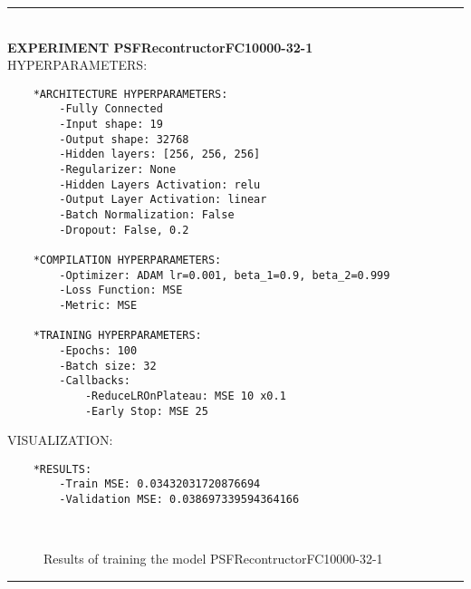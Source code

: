 \rule{0.5\textwidth}{0.5pt}\\

	{\large \textbf{EXPERIMENT PSFRecontructorFC10000-32-1}}\\
	
	{\normalsize HYPERPARAMETERS:}
	\begin{lstlisting}
	*ARCHITECTURE HYPERPARAMETERS:
		-Fully Connected
		-Input shape: 19
		-Output shape: 32768
		-Hidden layers: [256, 256, 256]
		-Regularizer: None
		-Hidden Layers Activation: relu
		-Output Layer Activation: linear
		-Batch Normalization: False
		-Dropout: False, 0.2
	
	*COMPILATION HYPERPARAMETERS:
		-Optimizer: ADAM lr=0.001, beta_1=0.9, beta_2=0.999
		-Loss Function: MSE
		-Metric: MSE
	
	*TRAINING HYPERPARAMETERS:
		-Epochs: 100
		-Batch size: 32
		-Callbacks: 
			-ReduceLROnPlateau: MSE 10 x0.1
			-Early Stop: MSE 25
	\end{lstlisting}
	
	{\normalsize VISUALIZATION:}
	\begin{lstlisting}
    *RESULTS:
        -Train MSE: 0.03432031720876694
        -Validation MSE: 0.038697339594364166
	\end{lstlisting}
	
	\begin{figure*}[ht!]
		\hspace{\fill}
		\hspace{\fill}	
		\\
		\caption{Results of training the model PSFRecontructorFC10000-32-1}
	\end{figure*}
	
\FloatBarrier	
\rule{0.5\textwidth}{0.5pt}\\